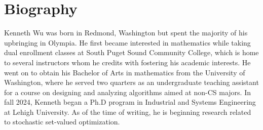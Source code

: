 \documentclass[12pt]{article}
\newcommand{\1}{\scalebox{1.06}{\ensuremath{\mathrel{\mathmybb{1}}}}}
\theoremstyle{definition}
\begin{document}
\newpage
\printbibliography

\section*{Biography}
Kenneth Wu was born in Redmond, Washington but spent the majority of his upbringing in Olympia. He first became interested in mathematics while taking dual enrollment classes at South Puget Sound Community College, which is home to several instructors whom he credits with fostering his academic interests. He went on to obtain his Bachelor of Arts in mathematics from the University of Washington, where he served two quarters as an undergraduate teaching assistant for a course on designing and analyzing algorithms aimed at non-CS majors. In fall 2024, Kenneth began a Ph.D program in Industrial and Systems Engineering at Lehigh University. As of the time of writing, he is beginning research related to stochastic set-valued optimization.






\end{document}
